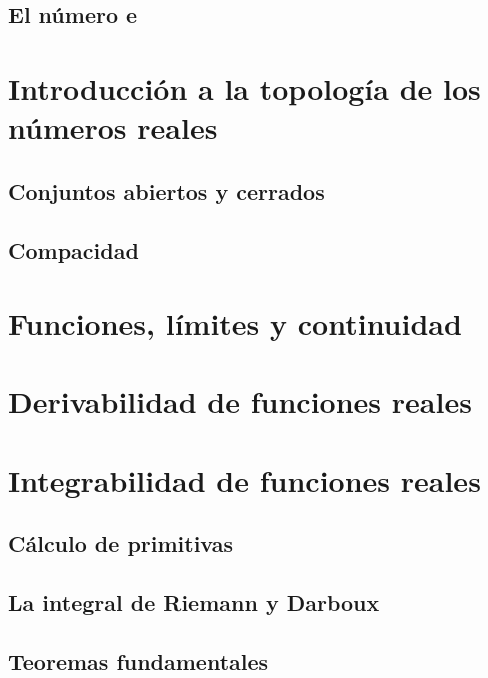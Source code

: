 \documentclass{article}
\begin{document}
\subsection{El número e}



\section{Introducción a la topología de los números reales}

\subsection{Conjuntos abiertos y cerrados}

\subsection{Compacidad}





\section{Funciones, límites y continuidad}






\section{Derivabilidad de funciones reales}







\section{Integrabilidad de funciones reales}

\subsection{Cálculo de primitivas}

\subsection{La integral de Riemann y Darboux}

\subsection{Teoremas fundamentales}
\end{document}
